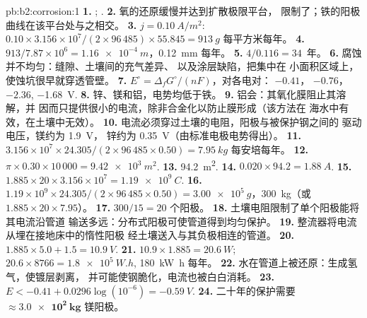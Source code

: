 \begin{solution}{pb:b2:corrosion:1}
\textbf{1.} ; .
\textbf{2.} 氧的还原缓慢并达到扩散极限平台，
限制了；铁的阳极曲线在该平台处与之相交。
\textbf{3.} $j = \qty{0.10}{A/m^2}$: $0.10 \times 3.156 \times 10^7/(2 \times 96\,485)
\times 55.845 = \qty{913}{g}$ 每平方米每年。
\textbf{4.} $913/7.87 \times 10^6 = \qty{1.16e-4}{m}$，\qty{0.12}{mm} 每年。
\textbf{5.} $4/0.116 = 34$~年。
\textbf{6.} 腐蚀并不均匀：缝隙、土壤间的充气差异、
以及涂层缺陷，把集中在
小面积区域上，使蚀坑很早就穿透管壁。
\textbf{7.} $E^\circ = \Delta_f G^\circ/(nF)$，对各电对： $-0.41$， $-0.76$，
 $-2.36$,  \qty{-1.68}{V}.
\textbf{8.} 锌、镁和铝，电势均低于铁。
\textbf{9.} 铝会：其氧化膜阻止其溶解，并
因而只提供很小的电流，除非合金化以防止膜形成（该方法在
海水中有效，在土壤中无效）。
\textbf{10.} 电流必须穿过土壤的电阻，阳极与被保护钢之间的
驱动电压，镁约为 \qty{1.9}{V}，
锌约为 \qty{0.35}{V}（由标准电极电势得出）。
\textbf{11.} $3.156 \times 10^7 \times 24.305/(2 \times 96\,485 \times 0.50) =
\qty{7.95}{kg}$ 每安培每年。
\textbf{12.} $\pi \times 0.30 \times 10\,000 = \qty{9.42e3}{m^2}$.
\textbf{13.} \qty{94.2}{m^2}.
\textbf{14.} $0.020 \times 94.2 = \qty{1.88}{A}$.
\textbf{15.} $1.885 \times 20 \times 3.156 \times 10^7 = \qty{1.19e9}{C}$.
\textbf{16.} $1.19 \times 10^9 \times 24.305/(2 \times 96\,485 \times 0.50) =
\qty{3.00e5}{g}$，\qty{300}{kg}（或 $1.885 \times 20 \times 7.95$）。
\textbf{17.} $300/15 = 20$ 个阳极。
\textbf{18.} 土壤电阻限制了单个阳极能将其电流沿管道
输送多远：分布式阳极可使管道得到均匀保护。
\textbf{19.} 整流器将电流从埋在接地床中的惰性阳极
经土壤送入与其负极相连的管道。
\textbf{20.} $1.885 \times 5.0 + 1.5 = \qty{10.9}{V}$.
\textbf{21.} $10.9 \times 1.885 = \qty{20.6}{W}$; $20.6 \times 8766 = \qty{1.8e5}{W.h}$,
\qty{180}{kW.h} 每年。
\textbf{22.} 水在管道上被还原：生成氢气，使镀层剥离，
并可能使钢脆化，电流也被白白消耗。
\textbf{23.} $E < -0.41 + 0.0296\log(10^{-6}) = \qty{-0.59}{V}$.
\textbf{24.} 二十年的保护需要 $\boldsymbol{\approx \qty{3.0e2}{kg}}$
镁阳极。
\end{solution}
